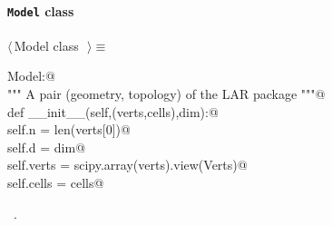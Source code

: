 \documentclass[11pt,oneside]{article}	%
\begin{document}
\paragraph{\texttt{Model} class}
\begin{flushleft} \small \label{scrap23}
$\langle\,$Model class\nobreak\ {\footnotesize {}}$\,\rangle\equiv$
\vspace{-1ex}
\begin{list}{}{} \item
\mbox{}\verb@class Model:@\\
\mbox{}\verb@   """ A pair (geometry, topology) of the LAR package """@\\
\mbox{}\verb@   def __init__(self,(verts,cells),dim):@\\
\mbox{}\verb@      self.n = len(verts[0])@\\
\mbox{}\verb@      self.d = dim@\\
\mbox{}\verb@      self.verts = scipy.array(verts).view(Verts)@\\
\mbox{}\verb@      self.cells = cells@\\
\mbox{}\verb@@{\NWsep}
\end{list}
\vspace{-1ex}
\footnotesize\addtolength{\baselineskip}{-1ex}
\begin{list}{}{\setlength{\itemsep}{-\parsep}\setlength{\itemindent}{-\leftmargin}}
\item \NWtxtMacroRefIn\ .
\end{list}
\end{flushleft}
\end{document}
